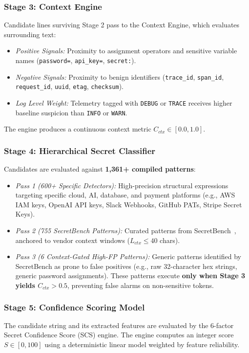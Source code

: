\documentclass[conference]{IEEEtran}
\begin{document}
\subsubsection{Stage 3: Context Engine}
Candidate lines surviving Stage 2 pass to the Context Engine, which evaluates surrounding text:
\begin{itemize}
    \item \textit{Positive Signals:} Proximity to assignment operators and sensitive variable names (\texttt{password=}, \texttt{api\_key=}, \texttt{secret:}).
    \item \textit{Negative Signals:} Proximity to benign identifiers (\texttt{trace\_id}, \texttt{span\_id}, \texttt{request\_id}, \texttt{uuid}, \texttt{etag}, \texttt{checksum}).
    \item \textit{Log Level Weight:} Telemetry tagged with \texttt{DEBUG} or \texttt{TRACE} receives higher baseline suspicion than \texttt{INFO} or \texttt{WARN}.
\end{itemize}
The engine produces a continuous context metric $C_{ctx} \in [0.0, 1.0]$.

\subsubsection{Stage 4: Hierarchical Secret Classifier}
Candidates are evaluated against \textbf{1,361+ compiled patterns}:
\begin{itemize}
    \item \textit{Pass 1 (600+ Specific Detectors):} High-precision structural expressions targeting specific cloud, AI, database, and payment platforms (e.g., AWS IAM keys, OpenAI API keys, Slack Webhooks, GitHub PATs, Stripe Secret Keys).
    \item \textit{Pass 2 (755 SecretBench Patterns):} Curated patterns from SecretBench~\cite{basak2023secretbench}, anchored to vendor context windows ($L_{ctx} \le 40$ chars).
    \item \textit{Pass 3 (6 Context-Gated High-FP Patterns):} Generic patterns identified by SecretBench as prone to false positives (e.g., raw 32-character hex strings, generic password assignments). These patterns execute \textbf{only when Stage 3 yields $C_{ctx} > 0.5$}, preventing false alarms on non-sensitive tokens.
\end{itemize}

\subsubsection{Stage 5: Confidence Scoring Model}
The candidate string and its extracted features are evaluated by the 6-factor Secret Confidence Score (SCS) engine. The engine computes an integer score $S \in [0, 100]$ using a deterministic linear model weighted by feature reliability.
\end{document}

